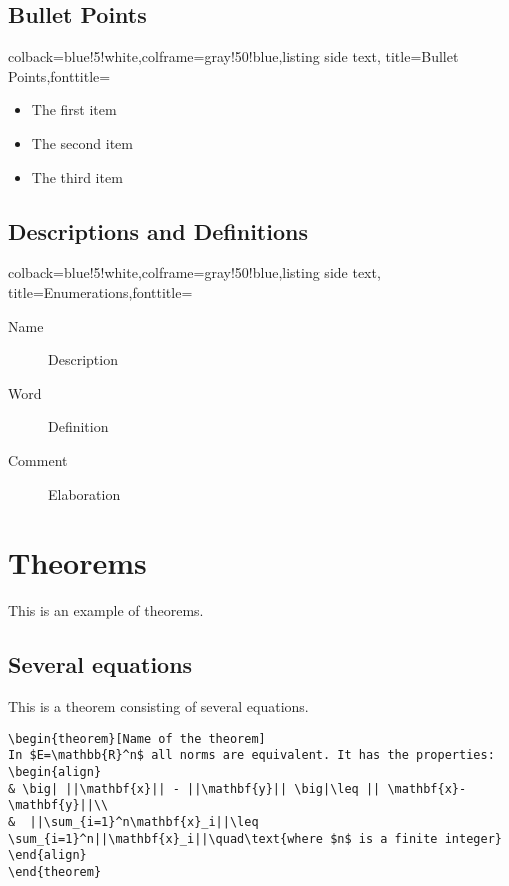 \subsection{Bullet Points}

\begin{tcblisting}{colback=blue!5!white,colframe=gray!50!blue,listing side text,
  title=Bullet Points,fonttitle=\bfseries}
\begin{itemize}
\item The first item
\item The second item
\item The third item
\end{itemize}
\end{tcblisting}

\subsection{Descriptions and Definitions}

\begin{tcblisting}{colback=blue!5!white,colframe=gray!50!blue,listing side text,
  title=Enumerations,fonttitle=\bfseries}
\begin{description}
\item[Name] Description
\item[Word] Definition
\item[Comment] Elaboration
\end{description}
\end{tcblisting}



\section{Theorems}

This is an example of theorems.

\subsection{Several equations}
This is a theorem consisting of several equations.

\begin{lstlisting}
\begin{theorem}[Name of the theorem]
In $E=\mathbb{R}^n$ all norms are equivalent. It has the properties:
\begin{align}
& \big| ||\mathbf{x}|| - ||\mathbf{y}|| \big|\leq || \mathbf{x}- \mathbf{y}||\\
&  ||\sum_{i=1}^n\mathbf{x}_i||\leq \sum_{i=1}^n||\mathbf{x}_i||\quad\text{where $n$ is a finite integer}
\end{align}
\end{theorem}
\end{lstlisting}

